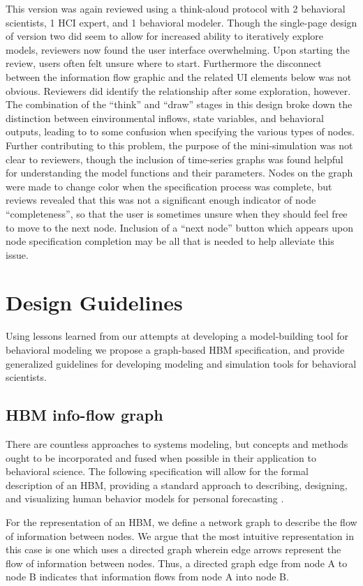 \documentclass[conference]{IEEEtran}
\begin{document}
This version was again reviewed using a think-aloud protocol with 2 behavioral scientists, 1 HCI expert, and 1 behavioral modeler.
Though the single-page design of version two did seem to allow for increased ability to iteratively explore models, reviewers now found the user interface overwhelming.
Upon starting the review, users often felt unsure where to start.
Furthermore the disconnect between the information flow graphic and the related UI elements below was not obvious.
Reviewers did identify the relationship after some exploration, however. 
The combination of the ``think'' and ``draw'' stages in this design broke down the distinction between einvironmental inflows, state variables, and behavioral outputs, leading to to some confusion when specifying the various types of nodes.
Further contributing to this problem, the purpose of the mini-simulation was not clear to reviewers, though the inclusion of time-series graphs was found helpful for understanding the model functions and their parameters.
Nodes on the graph were made to change color when the specification process was complete, but reviews revealed that this was not a significant enough indicator of node ``completeness'', so that the user is sometimes unsure when they should feel free to move to the next node.
Inclusion of a ``next node'' button which appears upon node specification completion may be all that is needed to help alleviate this issue.

  
\section{Design Guidelines}
Using lessons learned from our attempts at developing a model-building tool for behavioral modeling we propose a graph-based HBM specification, and provide generalized guidelines for developing modeling and simulation tools for behavioral scientists.

\subsection{HBM info-flow graph}
There are countless approaches to systems modeling, but concepts and methods ought to be incorporated and fused when possible in their application to behavioral science.
The following specification will allow for the formal description of an HBM, providing a standard approach to describing, designing, and visualizing human behavior models for personal forecasting .

For the representation of an HBM, we define a network graph to describe the flow of information between nodes.
We argue that the most intuitive representation in this case is one which uses a directed graph wherein edge arrows represent the flow of information between nodes.
Thus, a directed graph edge from node A to node B indicates that information flows from node A into node B. 
\end{document}
